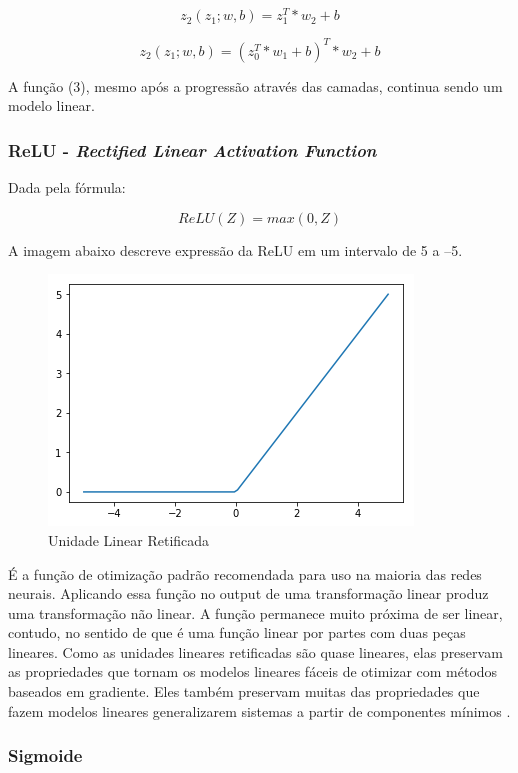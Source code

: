 \documentclass[12pt]{article}
\begin{document}
\begin{equation}
    z_2(z_1; w, b) = z_1^T * w_2 + b
\end{equation}

\begin{equation}
    z_2(z_1; w, b) = (z_0^T * w_1 + b)^T * w_2 + b
\end{equation}

A função (3), mesmo após a progressão através das camadas, continua sendo um modelo linear.

\subsubsection{ReLU - \textit{Rectified Linear Activation Function}}

Dada pela fórmula:

\begin{equation}
    ReLU(Z) = max(0, Z)
\end{equation}

A imagem abaixo descreve expressão da ReLU em um intervalo de 5 a –5.

\begin{figure}[!htb]
\centering
\includegraphics[width=.5\textwidth]{images/relu.png}
\caption{Unidade Linear Retificada}
\label{fig:relu}
\end{figure}

É a função de otimização padrão recomendada para uso na maioria das redes neurais. Aplicando essa função no output de uma transformação linear produz uma transformação não linear. A função permanece muito próxima de ser linear, contudo, no sentido de que é uma função linear por partes com duas peças lineares. Como as unidades lineares retificadas são quase lineares, elas preservam as propriedades que tornam os modelos lineares fáceis de otimizar com métodos baseados em gradiente. Eles também preservam muitas das propriedades que fazem modelos lineares generalizarem sistemas a partir de componentes mínimos \cite{Goodfellow-et-al-2016}.

\subsubsection{Sigmoide}
\end{document}
